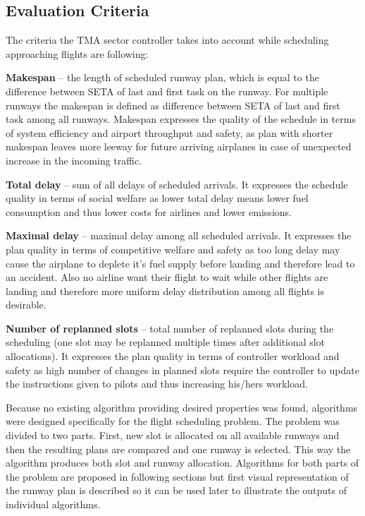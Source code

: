 \subsection{Evaluation Criteria}

The criteria the TMA sector controller takes into account while scheduling approaching flights are following:

\bitem
\item \textbf{Makespan} – the length of scheduled runway plan, which is equal to the difference between SETA of last and first task on the runway. For multiple runways the makespan is defined as difference between SETA of last and first task among all runways. Makespan expresses the quality of the schedule in terms of system efficiency and airport throughput and safety, as plan with shorter makespan leaves more leeway for future arriving airplanes in case of unexpected increase in the incoming traffic.
\item \textbf{Total delay} – sum of all delays of scheduled arrivals. It expresses the schedule quality in terms of social welfare as lower total delay means lower fuel consumption and thus lower costs for airlines and lower emissions.
\item \textbf{Maximal delay} – maximal delay among all scheduled arrivals. It expresses the plan quality in terms of competitive welfare and safety as too long delay may cause the airplane to deplete it's fuel supply before landing and therefore lead to an accident. Also no airline want their flight to wait while other flights are landing and therefore more uniform delay distribution among all flights is desirable.
\item \textbf{Number of replanned slots} – total number of replanned slots during the scheduling (one slot may be replanned multiple times after additional slot allocations). It expresses the plan quality in terms of controller workload and safety as high number of changes in planned slots require the controller to update the instructions given to pilots and thus increasing his/hers workload.
\eitem

Because no existing algorithm providing desired properties was found, algorithms were designed specifically for the flight scheduling problem. The problem was divided to two parts. First, new slot is allocated on all available runways and then the resulting plans are compared and one runway is selected. This way the algorithm produces both slot and runway allocation. Algorithms for both parts of the problem are proposed in following sections but first visual representation of the runway plan is described so it can be used later to illustrate the outputs of individual algorithms.

